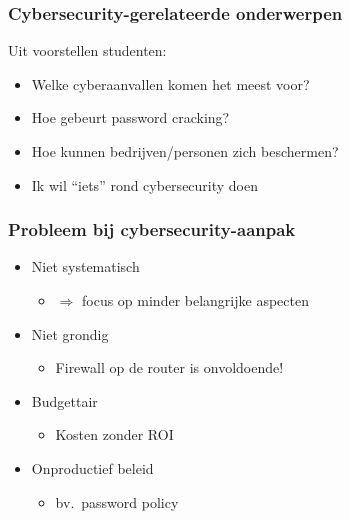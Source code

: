 \documentclass[aspectratio=169]{beamer}
\begin{document}
\begin{frame}
  \frametitle{Cybersecurity-gerelateerde onderwerpen}

  Uit voorstellen studenten:

  \begin{itemize}
    \item Welke cyberaanvallen komen het meest voor?
    \item Hoe gebeurt password cracking?
    \item Hoe kunnen bedrijven/personen zich beschermen?
    \item Ik wil ``iets'' rond cybersecurity doen
  \end{itemize}

  \bigskip


\end{frame}

\begin{frame}
  \frametitle{Probleem bij cybersecurity-aanpak}

  \begin{itemize}
    \item Niet systematisch
    \begin{itemize}
      \item $\Rightarrow$ focus op minder belangrijke aspecten
    \end{itemize}
    \item Niet grondig
    \begin{itemize}
      \item Firewall op de router is onvoldoende!
    \end{itemize}
    \item Budgettair
    \begin{itemize}
      \item Kosten zonder ROI
    \end{itemize}
    \item Onproductief beleid
    \begin{itemize}
      \item bv.\ password policy
    \end{itemize}
  \end{itemize}

\end{frame}
\end{document}
